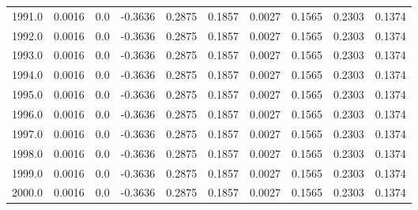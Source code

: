 \begin{longtable}{lrrrrrrrrr}
1991.0 & 0.0016 & 0.0 & -0.3636 & 0.2875 & 0.1857 & 0.0027 & 0.1565 & 0.2303 & 0.1374 \\
1992.0 & 0.0016 & 0.0 & -0.3636 & 0.2875 & 0.1857 & 0.0027 & 0.1565 & 0.2303 & 0.1374 \\
1993.0 & 0.0016 & 0.0 & -0.3636 & 0.2875 & 0.1857 & 0.0027 & 0.1565 & 0.2303 & 0.1374 \\
1994.0 & 0.0016 & 0.0 & -0.3636 & 0.2875 & 0.1857 & 0.0027 & 0.1565 & 0.2303 & 0.1374 \\
1995.0 & 0.0016 & 0.0 & -0.3636 & 0.2875 & 0.1857 & 0.0027 & 0.1565 & 0.2303 & 0.1374 \\
1996.0 & 0.0016 & 0.0 & -0.3636 & 0.2875 & 0.1857 & 0.0027 & 0.1565 & 0.2303 & 0.1374 \\
1997.0 & 0.0016 & 0.0 & -0.3636 & 0.2875 & 0.1857 & 0.0027 & 0.1565 & 0.2303 & 0.1374 \\
1998.0 & 0.0016 & 0.0 & -0.3636 & 0.2875 & 0.1857 & 0.0027 & 0.1565 & 0.2303 & 0.1374 \\
1999.0 & 0.0016 & 0.0 & -0.3636 & 0.2875 & 0.1857 & 0.0027 & 0.1565 & 0.2303 & 0.1374 \\
2000.0 & 0.0016 & 0.0 & -0.3636 & 0.2875 & 0.1857 & 0.0027 & 0.1565 & 0.2303 & 0.1374 \\
\end{longtable}